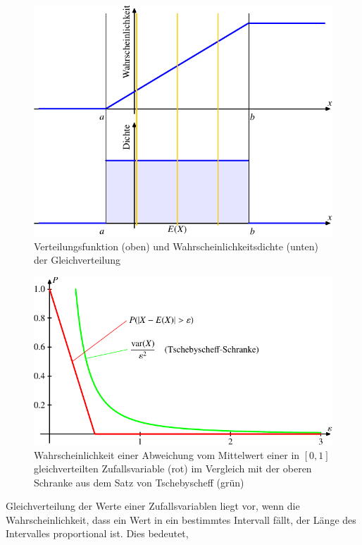 \begin{figure}
\begin{center}
\includegraphics[width=0.8\hsize]{images/verteilungsfunktion-7}
\end{center}
\caption{Verteilungsfunktion (oben) und Wahrscheinlichkeitsdichte (unten)
der Gleichverteilung\label{bild-gleichverteilung}}
\end{figure}
\begin{figure}
\begin{center}
\includegraphics{images/gl-1.pdf}
\end{center}
\caption{Wahrscheinlichkeit einer Abweichung vom Mittelwert einer
in $[0,1]$ gleichverteilten Zufallsvariable (rot) im Vergleich mit
der oberen Schranke aus dem Satz von Tschebyscheff (grün)
\label{bild-gleichverteilung-wahrscheinlichkeit}} %
\end{figure}
Gleichverteilung der Werte einer Zufallsvariablen liegt vor, wenn
die Wahrscheinlichkeit, dass ein Wert in ein bestimmtes Intervall
fällt, der Länge des Intervalles proportional ist.
Dies bedeutet,
